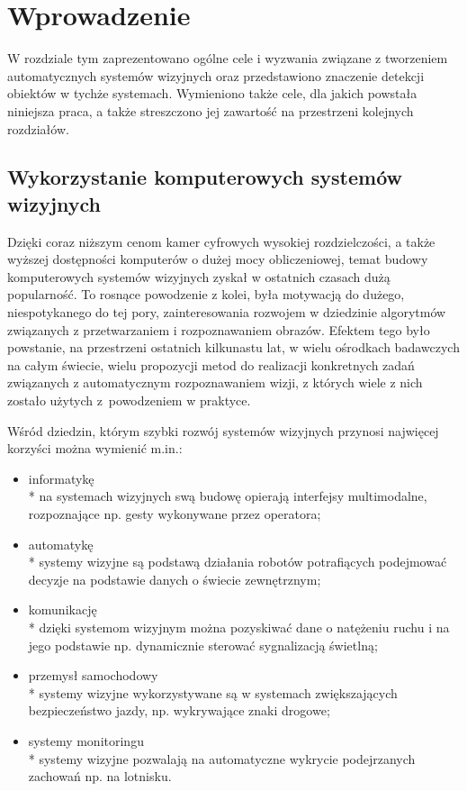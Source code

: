 \chapter{Wprowadzenie}
\label{cha:wprowadzenie}

W rozdziale tym zaprezentowano ogólne cele i wyzwania związane z tworzeniem automatycznych systemów wizyjnych oraz przedstawiono znaczenie detekcji obiektów w tychże systemach.
Wymieniono także cele, dla jakich powstała niniejsza praca, a także streszczono jej zawartość na przestrzeni kolejnych rozdziałów. 


\section{Wykorzystanie komputerowych systemów wizyjnych}
\label{sec:systemy}

Dzięki coraz niższym cenom kamer cyfrowych wysokiej rozdzielczości, a także wyższej dostępności komputerów o dużej mocy obliczeniowej, temat budowy komputerowych systemów wizyjnych zyskał w ostatnich czasach dużą popularność. To rosnące powodzenie z kolei, była motywacją do dużego, niespotykanego do tej pory, zainteresowania rozwojem w dziedzinie algorytmów związanych z przetwarzaniem i rozpoznawaniem obrazów. Efektem tego było powstanie, na przestrzeni ostatnich kilkunastu lat, w wielu ośrodkach badawczych na całym świecie, wielu propozycji metod do realizacji konkretnych zadań związanych z automatycznym rozpoznawaniem wizji, z których wiele z nich zostało użytych z~powodzeniem w praktyce.

Wśród dziedzin, którym szybki rozwój systemów wizyjnych przynosi najwięcej korzyści można wymienić m.in.:
\begin{itemize}
\item informatykę\\*
na systemach wizyjnych swą budowę opierają interfejsy multimodalne, rozpoznające np. gesty wykonywane przez operatora;
\item automatykę\\*
systemy wizyjne są podstawą działania robotów potrafiących podejmować decyzje na podstawie danych o świecie zewnętrznym;
\item komunikację\\*
dzięki systemom wizyjnym można pozyskiwać dane o natężeniu ruchu i na jego podstawie np. dynamicznie sterować sygnalizacją świetlną;
\item przemysł samochodowy\\*
systemy wizyjne wykorzystywane są w systemach zwiększających bezpieczeństwo jazdy, np. wykrywające znaki drogowe;
\item systemy monitoringu\\*
systemy wizyjne pozwalają na automatyczne wykrycie podejrzanych zachowań np. na lotnisku.
\end{itemize}

